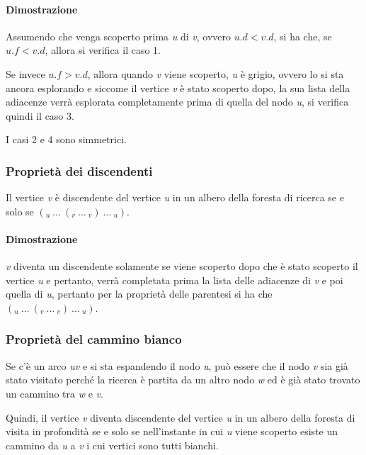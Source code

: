 \paragraph{Dimostrazione}\label{dimostrazione}

Assumendo che venga scoperto prima \emph{u} di \emph{v}, ovvero
$u.d < v.d$, si ha che, se $u.f < v.d$,
allora si verifica il caso 1.

Se invece $u.f > v.d$, allora quando \emph{v} viene
scoperto, \emph{u} è grigio, ovvero lo si sta ancora esplorando e
siccome il vertice \emph{v} è stato scoperto dopo, la sua lista della
adiacenze verrà esplorata completamente prima di quella del nodo
\emph{u}, si verifica quindi il caso 3.

I casi 2 e 4 sono simmetrici.

\subsubsection{Proprietà dei discendenti}\label{proprietuxe0-dei-discendenti}

Il vertice \emph{v} è discendente del vertice \emph{u} in un albero
della foresta di ricerca se e solo se $(_u \: \ldots \: (_v \: \ldots \:_v) \: \ldots \:_u)$.

\paragraph{Dimostrazione}\label{dimostrazione-1}

\emph{v} diventa un discendente solamente se viene scoperto dopo che è
stato scoperto il vertice \emph{u} e pertanto, verrà completata prima la
lista delle adiacenze di \emph{v} e poi quella di \emph{u}, pertanto per
la proprietà delle parentesi si ha che $(_u \: \ldots \: (_v \: \ldots \:_v) \: \ldots \:_u)$.

\subsubsection{Proprietà del cammino bianco}\label{proprietuxe0-del-cammino-bianco}

Se c'è un arco \emph{uv} e si sta espandendo il nodo \emph{u}, può
essere che il nodo \emph{v} sia già stato visitato perché la ricerca è
partita da un altro nodo \emph{w} ed è già stato trovato un cammino tra
\emph{w} e \emph{v}.

Quindi, il vertice \emph{v} diventa discendente del vertice \emph{u} in
un albero della foresta di visita in profondità se e solo se
nell'instante in cui \emph{u} viene scoperto esiste un cammino da
\emph{u} a \emph{v} i cui vertici sono tutti bianchi.


